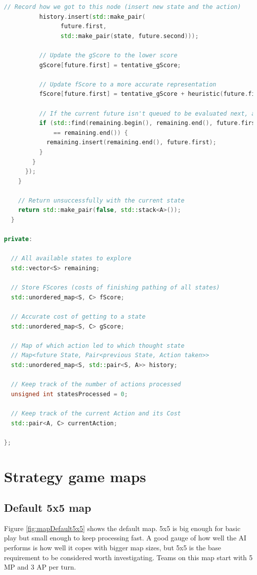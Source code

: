 \documentclass[11pt, a4paper]{report}
\begin{document}
\begin{appendices}
\begin{lstlisting}[language=C++]
          // Record how we got to this node (insert new state and the action)
          history.insert(std::make_pair(
                future.first, 
                std::make_pair(state, future.second)));

          // Update the gScore to the lower score
          gScore[future.first] = tentative_gScore;

          // Update fScore to a more accurate representation
          fScore[future.first] = tentative_gScore + heuristic(future.first);

          // If the current future isn't queued to be evaluated next, add it
          if (std::find(remaining.begin(), remaining.end(), future.first) 
              == remaining.end()) {
            remaining.insert(remaining.end(), future.first);
          }
        }
      });
    }

    // Return unsuccessfully with the current state
    return std::make_pair(false, std::stack<A>());
  }

private:

  // All available states to explore
  std::vector<S> remaining;

  // Store FScores (costs of finishing pathing of all states)
  std::unordered_map<S, C> fScore;

  // Accurate cost of getting to a state
  std::unordered_map<S, C> gScore;

  // Map of which action led to which thought state
  // Map<future State, Pair<previous State, Action taken>>
  std::unordered_map<S, std::pair<S, A>> history;

  // Keep track of the number of actions processed
  unsigned int statesProcessed = 0;

  // Keep track of the current Action and its Cost
  std::pair<A, C> currentAction;

};
\end{lstlisting}
\linespread{1.5}

\chapter{Strategy game maps}
\label{appendix:strategyGameMaps}

\section{Default 5x5 map}
\label{sec:mapDefault5x5}

Figure \ref{fig:mapDefault5x5} shows the default map. 5x5 is big enough for basic play but small enough to keep processing fast. A good gauge of how well the AI performs is how well it copes with bigger map sizes, but 5x5 is the base requirement to be considered worth investigating. Teams on this map start with 5 MP and 3 AP per turn.


\end{appendices}
\end{document}
